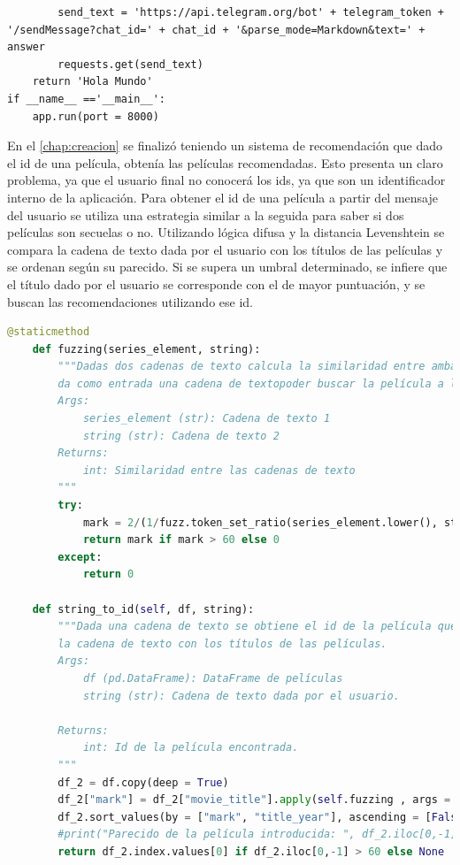 \begin{lstlisting}
        send_text = 'https://api.telegram.org/bot' + telegram_token + '/sendMessage?chat_id=' + chat_id + '&parse_mode=Markdown&text=' + answer
        requests.get(send_text)
    return 'Hola Mundo'
if __name__ =='__main__':
    app.run(port = 8000)
\end{lstlisting}

En el \autoref{chap:creacion} se finalizó teniendo un sistema de recomendación que dado el id de una película, obtenía las películas recomendadas. Esto presenta un claro problema, ya que el usuario final no conocerá los ids, ya que son un identificador interno de la aplicación. Para obtener el id de una película a partir del mensaje del usuario se utiliza una estrategia similar a la seguida para saber si dos películas son secuelas o no. Utilizando lógica difusa y la distancia Levenshtein se compara la cadena de texto dada por el usuario con los títulos de las películas y se ordenan según su parecido. Si se supera un umbral determinado, se infiere que el título dado por el usuario se corresponde con el de mayor puntuación, y se buscan las recomendaciones utilizando ese id.

\begin{lstlisting}[language=Python, label = {lst:API}, caption= {Búsqueda del id de la película dada por el usuario. Estas funciones implementan la búsqueda de la película más parecida dentro de un umbral.}]
    @staticmethod
    def fuzzing(series_element, string):
        """Dadas dos cadenas de texto calcula la similaridad entre ambas. Se usa para cuando el usuario
        da como entrada una cadena de textopoder buscar la película a la que se refiere.
        Args:
            series_element (str): Cadena de texto 1
            string (str): Cadena de texto 2
        Returns:
            int: Similaridad entre las cadenas de texto
        """
        try:
            mark = 2/(1/fuzz.token_set_ratio(series_element.lower(), string.lower()) + 1/fuzz.ratio(series_element.lower(), string.lower()))
            return mark if mark > 60 else 0
        except:
            return 0

    def string_to_id(self, df, string):
        """Dada una cadena de texto se obtiene el id de la película que más se parece. Para ello se compara
        la cadena de texto con los títulos de las películas.
        Args:
            df (pd.DataFrame): DataFrame de películas
            string (str): Cadena de texto dada por el usuario.
        
        Returns:
            int: Id de la película encontrada.
        """
        df_2 = df.copy(deep = True)
        df_2["mark"] = df_2["movie_title"].apply(self.fuzzing , args = (string,))
        df_2.sort_values(by = ["mark", "title_year"], ascending = [False, True], inplace = True)
        #print("Parecido de la película introducida: ", df_2.iloc[0,-1])
        return df_2.index.values[0] if df_2.iloc[0,-1] > 60 else None
\end{lstlisting}

